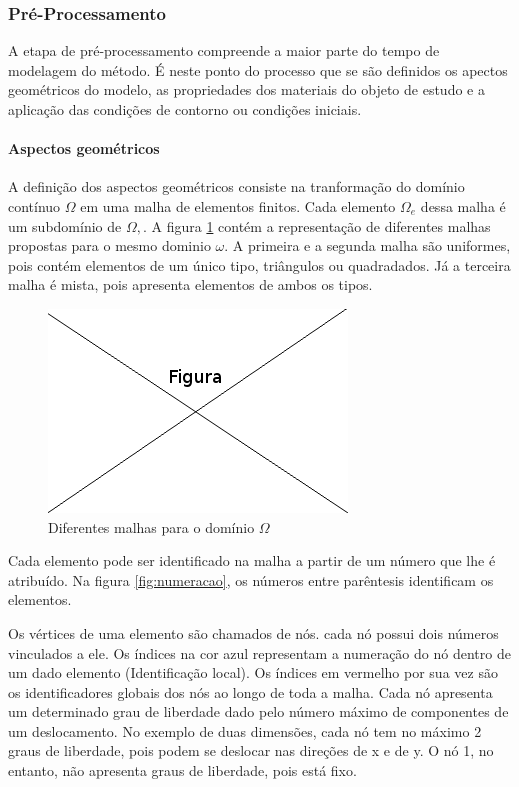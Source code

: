 \subsubsection{Pré-Processamento}

A etapa de pré-processamento compreende a maior parte do tempo de modelagem do método. É neste ponto do processo que se são definidos os apectos geométricos do modelo, as propriedades dos materiais do objeto de estudo e a aplicação das condições de contorno ou condições iniciais.

\paragraph{Aspectos geométricos \\} 
A definição dos aspectos geométricos consiste na tranformação do domínio contínuo $\Omega$ em uma malha de elementos finitos. Cada elemento $\Omega_e$ dessa malha é um subdomínio de $\Omega,$. A figura \ref{fig:malhas} contém a representação de diferentes malhas propostas para o mesmo dominio $\omega$. A primeira e a segunda malha são uniformes, pois contém elementos de um único tipo, triângulos ou quadradados. Já a terceira malha é mista, pois apresenta elementos de ambos os tipos. 

\begin{figure}[!htb]
\centering
\includegraphics[scale=0.5]{figuras/temp.png}
\caption{Diferentes malhas para o domínio $\Omega$}
\label{fig:malhas}
\end{figure}

Cada elemento pode ser identificado na malha a partir de um número que lhe é atribuído. Na figura \ref{fig:numeracao}, os números entre parêntesis identificam os elementos.

Os vértices de uma elemento são chamados de nós. cada nó possui dois números vinculados a ele. Os índices na cor azul representam a numeração do nó dentro de um dado elemento (Identificação local). Os índices em vermelho por sua vez são os identificadores globais dos nós ao longo de toda a malha. Cada nó apresenta um determinado grau de liberdade dado pelo número máximo de componentes de um deslocamento. No exemplo de duas dimensões, cada nó tem no máximo 2 graus de liberdade, pois podem se deslocar nas direções de x e de y. O nó 1, no entanto, não apresenta graus de liberdade, pois está fixo. 

